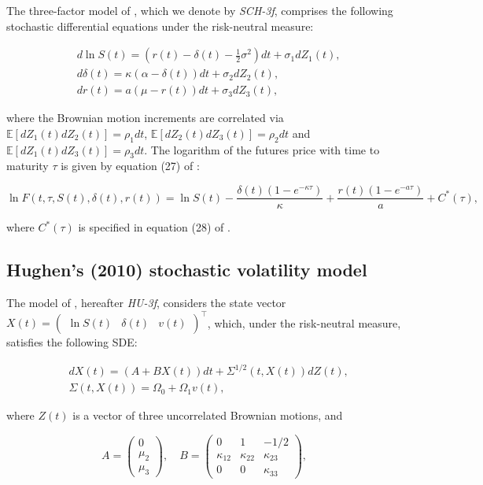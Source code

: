 \documentclass{article}
\begin{document}
The three-factor model of \cite{schwartz97}, which we denote by \textit{SCH-3f}, comprises the following stochastic differential equations under the risk-neutral measure:

\begin{align*}
    &d \ln S(t) =  \left(r(t) - \delta(t) - \frac{1}{2} \sigma^2  \right)dt + \sigma_1 dZ_{1}(t), \\ 
    &d\delta(t) = \kappa \left( \alpha - \delta(t) \right)dt + \sigma_2 dZ_{2}(t), \\ 
    &dr(t) = a \left(\mu - r(t) \right) dt + \sigma_3 dZ_{3}(t),
\end{align*}

\noindent where the Brownian motion increments are correlated via $ \mathbb{E}[dZ_{1}(t) dZ_{2}(t)] = \rho_{1} dt$, $ \mathbb{E}[dZ_{2}(t) dZ_{3}(t)] = \rho_{2} dt$ and $ \mathbb{E}[dZ_{1}(t) dZ_{3}(t)] = \rho_{3} dt$. The logarithm of the futures price with time to maturity $\tau$ is given by equation (27) of \cite{schwartz97}:

\begin{equation*}
    \ln{F(t,\tau, S(t), \delta(t), r(t))} = \ln S(t) - \frac{\delta(t)(1-e^{-\kappa \tau})}{\kappa} + \frac{r(t)(1-e^{-
    a \tau})}{a} + C^*(\tau),
\end{equation*}

\noindent where $C^*(\tau)$ is specified in equation (28) of \cite{schwartz97}.

\subsection{Hughen's (2010) stochastic volatility model}

The model of \cite{hughen10}, hereafter \textit{HU-3f}, considers the state vector \({X}(t) = \begin{pmatrix} \ln S(t) & \delta(t) & v(t) \end{pmatrix}^\top \), which, under the risk-neutral measure, satisfies the following SDE:

\begin{align*}
    &d{X}(t) = \left( A + B {X}(t) \right) dt + \Sigma^{1/2}(t,X(t)) d{Z}(t), \\
    &\Sigma(t,X(t)) = \Omega_0 + \Omega_1 v(t),
\end{align*}

\noindent where ${Z}(t)$ is a vector of three uncorrelated Brownian motions, and 

\begin{equation*}
    A = \begin{pmatrix}
        0 \\
        \mu_2  \\
        \mu_3 
    \end{pmatrix}, \quad 
    B = \begin{pmatrix}
        0 & 1 & -1/2  \\
        \kappa_{12} & \kappa_{22} & \kappa_{23}  \\
        0 & 0  & \kappa_{33}
    \end{pmatrix},
\end{equation*} 
\end{document}
